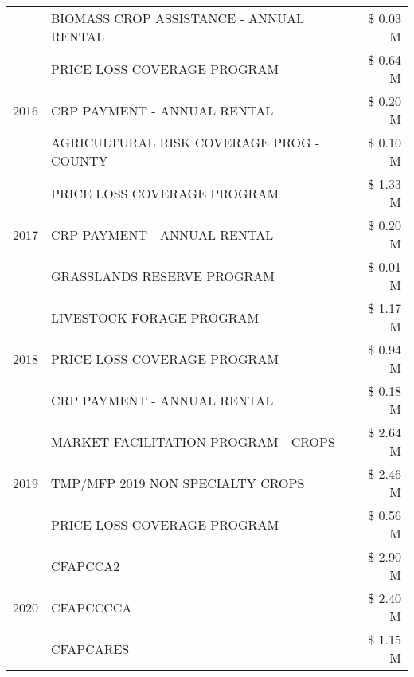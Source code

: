 \begin{tabular}{llr}
 & BIOMASS CROP ASSISTANCE - ANNUAL RENTAL & \$ 0.03 M \\
\cline{1-3}
\multirow[t]{3}{*}{2016} & PRICE LOSS COVERAGE PROGRAM & \$ 0.64 M \\
 & CRP PAYMENT - ANNUAL RENTAL & \$ 0.20 M \\
 & AGRICULTURAL RISK COVERAGE PROG - COUNTY & \$ 0.10 M \\
\cline{1-3}
\multirow[t]{3}{*}{2017} & PRICE LOSS COVERAGE PROGRAM & \$ 1.33 M \\
 & CRP PAYMENT - ANNUAL RENTAL & \$ 0.20 M \\
 & GRASSLANDS RESERVE PROGRAM & \$ 0.01 M \\
\cline{1-3}
\multirow[t]{3}{*}{2018} & LIVESTOCK FORAGE PROGRAM & \$ 1.17 M \\
 & PRICE LOSS COVERAGE PROGRAM & \$ 0.94 M \\
 & CRP PAYMENT - ANNUAL RENTAL & \$ 0.18 M \\
\cline{1-3}
\multirow[t]{3}{*}{2019} & MARKET FACILITATION PROGRAM - CROPS & \$ 2.64 M \\
 & TMP/MFP 2019 NON SPECIALTY CROPS & \$ 2.46 M \\
 & PRICE LOSS COVERAGE PROGRAM & \$ 0.56 M \\
\cline{1-3}
\multirow[t]{3}{*}{2020} & CFAPCCA2 & \$ 2.90 M \\
 & CFAPCCCCA & \$ 2.40 M \\
 & CFAPCARES & \$ 1.15 M \\
\cline{1-3}
\bottomrule
\end{tabular}
